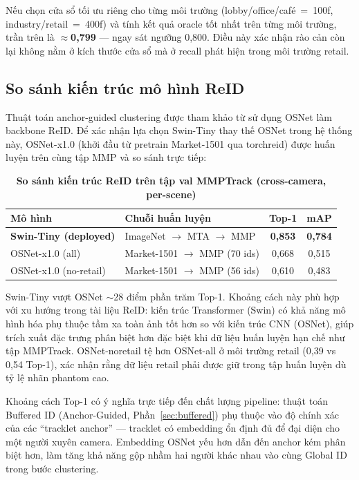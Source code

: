 \documentclass{article} %
\begin{document}
Nếu chọn cửa sổ tối ưu riêng cho từng môi trường (lobby/office/café~=~100f, industry/retail~=~400f) và
tính kết quả oracle tốt nhất trên từng môi trường, trần trên là $\approx$\textbf{0,799} --- ngay sát
ngưỡng 0,800. Điều này xác nhận rào cản còn lại không nằm ở kích thước cửa sổ mà ở recall phát hiện
trong môi trường retail.

\subsection{So sánh kiến trúc mô hình ReID}

Thuật toán anchor-guided clustering được tham khảo từ \cite{Huang2023} sử dụng OSNet làm backbone ReID. Để xác nhận lựa chọn Swin-Tiny thay thế OSNet trong hệ thống này, OSNet-x1.0 (khởi đầu từ pretrain Market-1501 qua torchreid) được huấn luyện trên cùng tập MMP và so sánh trực tiếp:

\begin{table}[H]
    \centering
    \caption[So sánh Swin-Tiny và OSNet trên tập MMP]{\bfseries\fontsize{12pt}{0pt}\selectfont So sánh kiến trúc ReID trên tập val MMPTrack (cross-camera, per-scene)}
    \begin{tabular}{|l|l|c|c|}
    \hline
    \bfseries Mô hình & \bfseries Chuỗi huấn luyện & \bfseries Top-1 & \bfseries mAP \\
    \hline
    \textbf{Swin-Tiny (deployed)} & ImageNet $\to$ MTA $\to$ MMP & \textbf{0{,}853} & \textbf{0{,}784} \\
    OSNet-x1.0 (all)             & Market-1501 $\to$ MMP (70 ids) & 0{,}668 & 0{,}515 \\
    OSNet-x1.0 (no-retail)       & Market-1501 $\to$ MMP (56 ids) & 0{,}610 & 0{,}483 \\
    \hline
    \end{tabular}
    \label{tab:reid_compare}
\end{table}

Swin-Tiny vượt OSNet $\sim$28 điểm phần trăm Top-1. Khoảng cách này phù hợp với xu hướng trong tài liệu ReID: kiến trúc Transformer (Swin) có khả năng mô hình hóa phụ thuộc tầm xa toàn ảnh tốt hơn so với kiến trúc CNN (OSNet), giúp trích xuất đặc trưng phân biệt hơn đặc biệt khi dữ liệu huấn luyện hạn chế như tập MMPTrack. OSNet-noretail tệ hơn OSNet-all ở môi trường retail (0{,}39 vs 0{,}54 Top-1), xác nhận rằng dữ liệu retail phải được giữ trong tập huấn luyện dù tỷ lệ nhãn phantom cao.

Khoảng cách Top-1 có ý nghĩa trực tiếp đến chất lượng pipeline: thuật toán Buffered ID (Anchor-Guided, Phần~\ref{sec:buffered}) phụ thuộc vào độ chính xác của các ``tracklet anchor'' --- tracklet có embedding ổn định đủ để đại diện cho một người xuyên camera. Embedding OSNet yếu hơn dẫn đến anchor kém phân biệt hơn, làm tăng khả năng gộp nhầm hai người khác nhau vào cùng Global ID trong bước clustering.
\end{document}
